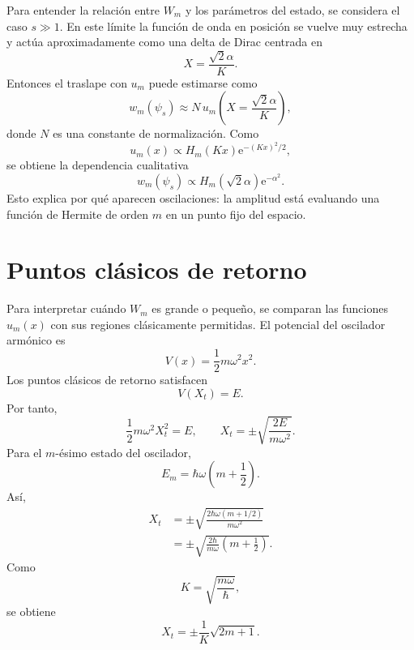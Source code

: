 \documentclass[11pt]{article}
\newcommand{\ee}{\mathrm{e}}
\begin{document}
Para entender la relaci\'on entre $W_m$ y los par\'ametros del estado, se
considera el caso $s\gg1$. En este l\'imite la funci\'on de onda en posici\'on
se vuelve muy estrecha y act\'ua aproximadamente como una delta de Dirac
centrada en
\begin{equation}
  X=\frac{\sqrt2\alpha}{K}.
\end{equation}
Entonces el traslape con $u_m$ puede estimarse como
\begin{equation}
  w_m(\psi_s)
  \approx
  N\,u_m\left(X=\frac{\sqrt2\alpha}{K}\right),
\end{equation}
donde $N$ es una constante de normalizaci\'on. Como
\begin{equation}
  u_m(x)\propto H_m(Kx)\ee^{-(Kx)^2/2},
\end{equation}
se obtiene la dependencia cualitativa
\begin{equation}
  w_m(\psi_s)\propto H_m(\sqrt2\alpha)\ee^{-\alpha^2}.
\end{equation}
Esto explica por qu\'e aparecen oscilaciones: la amplitud est\'a evaluando una
funci\'on de Hermite de orden $m$ en un punto fijo del espacio.

\section{Puntos cl\'asicos de retorno}

Para interpretar cu\'ando $W_m$ es grande o peque\~no, se comparan las
funciones $u_m(x)$ con sus regiones cl\'asicamente permitidas. El potencial del
oscilador arm\'onico es
\begin{equation}
  V(x)=\frac12m\omega^2x^2.
\end{equation}
Los puntos cl\'asicos de retorno satisfacen
\begin{equation}
  V(X_t)=E.
\end{equation}
Por tanto,
\begin{equation}
  \frac12m\omega^2X_t^2=E,
  \qquad
  X_t=\pm\sqrt{\frac{2E}{m\omega^2}}.
\end{equation}
Para el $m$-\'esimo estado del oscilador,
\begin{equation}
  E_m=\hbar\omega\left(m+\frac12\right).
\end{equation}
As\'i,
\begin{align}
  X_t
  &=
  \pm
  \sqrt{
  \frac{2\hbar\omega(m+1/2)}{m\omega^2}
  }\\
  &=
  \pm
  \sqrt{\frac{2\hbar}{m\omega}\left(m+\frac12\right)}.
\end{align}
Como
\begin{equation}
  K=\sqrt{\frac{m\omega}{\hbar}},
\end{equation}
se obtiene
\begin{equation}
  \boxed{
  X_t=\pm\frac{1}{K}\sqrt{2m+1}.
  }
\end{equation}
\end{document}
